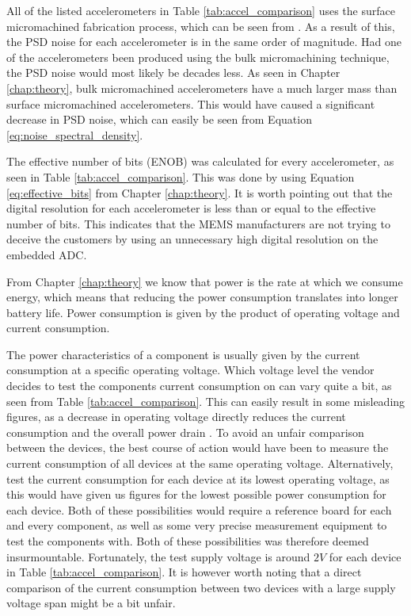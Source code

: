 All of the listed accelerometers in Table \ref{tab:accel_comparison} uses the surface micromachined fabrication process, which can be seen from \cite{ADXL362, MMA8491Q, MC3610, LIS3DH, KX123}. As a result of this, the PSD noise for each accelerometer is in the same order of magnitude. Had one of the accelerometers been produced using the bulk micromachining technique, the PSD noise would most likely be decades less. As seen in Chapter \ref{chap:theory}, bulk micromachined accelerometers have a much larger mass than surface micromachined accelerometers. This would have caused a significant decrease in PSD noise, which can easily be seen from Equation \ref{eq:noise_spectral_density}.

The effective number of bits (ENOB) was calculated for every accelerometer, as seen in Table \ref{tab:accel_comparison}. This was done by using Equation \ref{eq:effective_bits} from Chapter \ref{chap:theory}. It is worth pointing out that the digital resolution for each accelerometer is less than or equal to the effective number of bits. This indicates that the MEMS manufacturers are not trying to deceive the customers by using an unnecessary high digital resolution on the embedded ADC.

From Chapter \ref{chap:theory} we know that power is the rate at which we consume energy, which means that reducing the power consumption translates into longer battery life. Power consumption is given by the product of operating voltage and current consumption. 

The power characteristics of a component is usually given by the current consumption at a specific operating voltage. Which voltage level the vendor decides to test the components current consumption on can vary quite a bit, as seen from Table \ref{tab:accel_comparison}. This can easily result in some misleading figures, as a decrease in operating voltage directly reduces the current consumption and the overall power drain \cite[~p.3]{holberg06}. To avoid an unfair comparison between the devices, the best course of action would have been to measure the current consumption of all devices at the same operating voltage. Alternatively, test the current consumption for each device at its lowest operating voltage, as this would have given us figures for the lowest possible power consumption for each device. Both of these possibilities would require a reference board for each and every component, as well as some very precise measurement equipment to test the components with. Both of these possibilities was therefore deemed insurmountable. Fortunately, the test supply voltage is around $2V$ for each device in Table \ref{tab:accel_comparison}. It is however worth noting that a direct comparison of the current consumption between two devices with a large supply voltage span might be a bit unfair.

